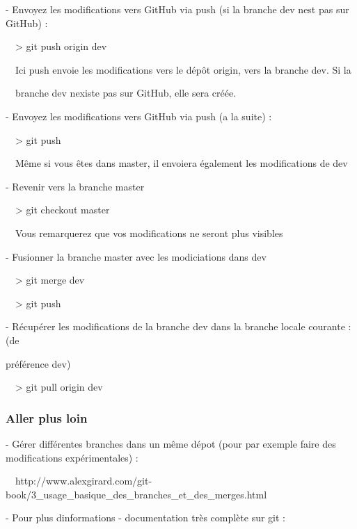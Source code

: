 \documentclass{mise_en_page}
\begin{document}
 {}- Envoyez les modifications vers GitHub via push (si la branche
{\textquotedbl}dev{\textquotedbl} n{\textquotesingle}est pas sur
GitHub) :

\ \ {\textgreater} git push origin dev

\ \ Ici push envoie les modifications vers le dépôt origin, vers la
branche {\textquotedbl}dev{\textquotedbl}. Si la

\ \ branche dev n{\textquotesingle}existe pas sur GitHub, elle sera
créée.




 {}- Envoyez les modifications vers GitHub via push (a la suite) :

\ \ {\textgreater} git push

\ \ Même si vous êtes dans master, il envoiera également les
modifications de {\textquotedbl}dev{\textquotedbl}




 {}- Revenir vers la branche master

\ \ {\textgreater} git checkout master

\ \ Vous remarquerez que vos modifications ne seront plus visibles




 {}- Fusionner la branche master avec les modiciations dans
{\textquotedbl}dev{\textquotedbl}

\ \ {\textgreater} git merge dev

\ \ {\textgreater} git push




 {}- Récupérer les modifications de la branche
{\textquotedbl}dev{\textquotedbl} dans la branche locale courante : (de

 préférence {\textquotedbl}dev{\textquotedbl})

\ \ {\textgreater} git pull origin dev




\subsubsection{Aller plus loin}



{}- Gérer différentes branches dans un même dépot (pour par exemple
faire des modifications expérimentales) :

\ \ http://www.alexgirard.com/git-book/3\_usage\_basique\_des\_branches\_et\_des\_merges.html




{}- Pour plus d{\textquotesingle}informations - documentation très
complète sur git :
\end{document}
